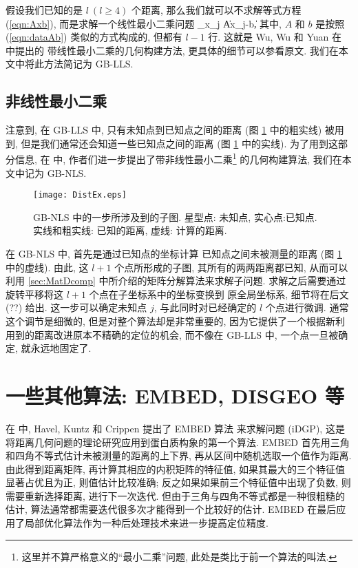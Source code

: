\documentclass{CASthesis_zzk}
\begin{document}
假设我们已知的是 $l ~(l\geq 4)$ 个距离, 
那么我们就可以不求解等式方程 (\ref{eqn:Axb}), 
而是求解一个线性最小二乘问题
\be \min_{x_j} \|Ax_j-b\|, \ee
其中, $A$ 和 $b$ 是按照 (\ref{eqn:dataAb}) 类似的方式构成的, 
但都有 $l-1$ 行. 
这就是 Wu, Wu 和 Yuan 在 \cite{Wu2008} 中提出的
带线性最小二乘的几何构建方法, 更具体的细节可以参看原文.
我们在本文中将此方法简记为 GB-LLS.

\subsection{非线性最小二乘}\label{NLS}
注意到, 在 GB-LLS 中, 只有未知点到已知点之间的距离
(图 \ref{fig:DistEx} 中的粗实线) 被用到,
但是我们通常还会知道一些已知点之间的距离 (图 \ref{fig:DistEx} 中的实线). 
为了用到这部分信息, 在 \cite{Wu2008} 中, 
作者们进一步提出了带非线性最小二乘\footnote{这里并不算严格意义的``最小二乘''问题, 此处是类比于前一个算法的叫法.}
的几何构建算法, 我们在本文中记为 GB-NLS.

\begin{figure}[htb!]
  \centering
  \texttt{[image: DistEx.eps]}\\
  \caption{GB-NLS 中的一步所涉及到的子图. 星型点: 未知点, 实心点:已知点.
  实线和粗实线: 已知的距离, 虚线: 计算的距离.}\label{fig:DistEx}
\end{figure}

在 GB-NLS 中, 首先是通过已知点的坐标计算
已知点之间未被测量的距离 (图 \ref{fig:DistEx} 中的虚线).
由此, 这 $l+1$ 个点所形成的子图, 其所有的两两距离都已知, 
从而可以利用 \ref{sec:MatDcomp} 中所介绍的矩阵分解算法来求解子问题.
求解之后需要通过旋转平移将这 $l+1$ 个点在子坐标系中的坐标变换到
原全局坐标系, 细节将在后文 (??) 给出.
这一步可以确定未知点 $j$, 与此同时对已经确定的 $l$ 个点进行微调. 
通常这个调节是细微的, 但是对整个算法却是非常重要的,
因为它提供了一个根据新利用到的距离改进原本不精确的定位的机会,
而不像在 GB-LLS 中, 一个点一旦被确定, 就永远地固定了.


\section{一些其他算法: EMBED, DISGEO 等}
\label{sec:otheralg}
在 \cite{havel1983combinatorial} 中, Havel, Kuntz 和 Crippen 提出了 EMBED 算法
来求解问题 (iDGP),
这是将距离几何问题的理论研究应用到蛋白质构象的第一个算法.
EMBED 首先用三角和四角不等式估计未被测量的距离的上下界,
再从区间中随机选取一个值作为距离. 
由此得到距离矩阵, 再计算其相应的内积矩阵的特征值,
如果其最大的三个特征值显著占优且为正, 则值估计比较准确;
反之如果如果前三个特征值中出现了负数, 则需要重新选择距离, 进行下一次迭代.
但由于三角与四角不等式都是一种很粗糙的估计, 
算法通常都需要迭代很多次才能得到一个比较好的估计.
EMBED 在最后应用了局部优化算法作为一种后处理技术来进一步提高定位精度.
\end{document}
